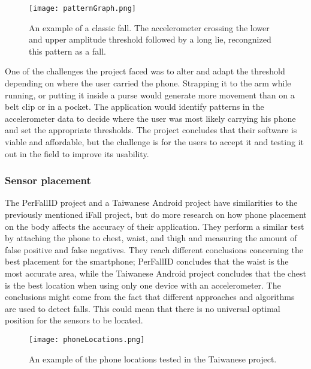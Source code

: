 \begin{figure}[h!]
  \centering
    \texttt{[image: patternGraph.png]}
    \caption{\footnotesize An example of a classic fall. The accelerometer crossing the lower and upper amplitude  threshold followed by a long lie, recongnized this pattern as a fall.}
\end{figure}

One of the challenges the project faced was to alter and adapt the threshold depending on where the user carried the phone. Strapping it to the arm while running, or putting it inside a purse would generate more movement than on a belt clip or in a pocket. The application would identify patterns in the accelerometer data to decide where the user was most likely carrying his phone and set the appropriate thresholds. The project concludes that their software is viable and affordable, but the challenge is for the users to accept it and testing it out in the field to improve its usability.

\subsubsection{Sensor placement}
The PerFallID\cite{fallPrevention} project and a Taiwanese Android \cite{mobilePhoneBasedFallDetection} project have similarities to the previously mentioned iFall project, but do more research on how phone placement on the body affects the accuracy of their application. They perform a similar test by attaching the phone to chest, waist, and thigh and measuring the amount of false positive and false negatives. They reach different conclusions concerning the best placement for the smartphone; PerFallID concludes that the waist is the most accurate area, while the Taiwanese Android project concludes that the chest is the best location when using only one device with an accelerometer. The conclusions might come from the fact that different approaches and algorithms are used to detect falls. This could mean that there is no universal optimal position for the sensors to be located.

\begin{figure}[h!]
  \centering
    \texttt{[image: phoneLocations.png]}
    \caption{\footnotesize An example of the phone locations tested in the Taiwanese project.} 
\end{figure}

